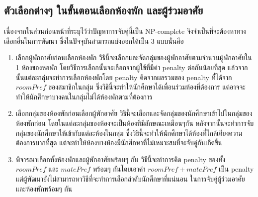 \subsection{ตัวเลือกต่างๆ ในขั้นตอนเลือกห้องพัก และผู้ร่วมอาศัย}
เนื่องจากในส่วนก่อนหน้าที่ระบุไว้ว่าปัญหาการจับคู่นี้เป็น NP-complete จึงจำเป็นที่จะต้องหาทางเลือกอื่นในการพัฒนา 
ซึ่งในปัจจุบันสามารถแบ่งออกได้เป็น 3 แบบนั่นคือ
\begin{enumerate}
  \item เลือกผู้พักอาศัยก่อนเลือกห้องพัก
        วิธินี้จะเลือกและจัดกลุ่มของผู้พักอาศัยตามจำนวนผู้พักอาศัยใน 1 ห้องของหอพัก โดยวิธีการเลือกนั้นจะเลือกจากผู้ใช้ที่มีค่า penalty ต่อกันน้อยที่สุด
        แล้วจากนั้นแต่ละกลุ่มจะทำการเลือกห้องพักโดย penalty คิดจากผลรวมของ penalty ที่ได้จาก $roomPref$ ของสมาชิกในกลุ่ม
        ซึ่งวิธินี้จะทำให้นักศึกษาได้เพื่อนร่วมห้องที่ต้องการ แต่อาจจะทำให้นักศึกษาบางคนในกลุ่มไม่ได้ห้องพักตามที่ต้องการ
  \item เลือกกลุ่มของห้องพักก่อนเลือกผู้พักอาศัย
        วิธีนี้จะเลือกและจัดกลุ่มของนักศึกษาเข้าไปในกลุ่มของห้องพักก่อน โดยในแต่ละกลุ่มของห้องจะเป็นห้องที่มีลักษณะเหมือนๆกัน
        หลังจากนั้นจะทำการจับกลุ่มของนักศึกษาให้เข้ากับแต่ละห้องในกลุ่ม ซึ่งวิธีนี้จะทำให้นักศึกษาได้ห้องที่ใกล้เคียงความต้องการมากที่สุด 
        แต่จะทำให้ห้องบางห้องมีนักศึกษาที่ไม่เหมาะสมที่จะจับคู่กันเกิดขึ้น
  \item พิจารณาเลือกทั้งห้องพักและผู้พักอาศัยพร้อมๆ กัน
        วิธีนี้จะทำการคิด penalty ของทั้ง $roomPref$ และ $matePref$ พร้อมๆ กันโดยเอาค่า $roomPref + matePref$ เป็น penalty
        แต่ผู้พัฒนายังไม่สามารถหาวิธีที่จะทำการเลือกลำดับนักศึกษาที่แน่นอน ในการจับคู่ผู้ร่วมอาศัยและห้องพักพร้อมๆ กัน
\end{enumerate}

